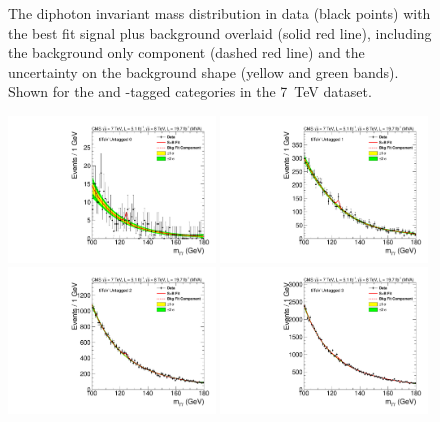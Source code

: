 \begin{figure}
  \caption[The diphoton invariant mass distribution in data with the best fit signal plus background overlaid for the \acs{VH} and \acs{ttH}-tagged categories in the 8~TeV dataset.]{The diphoton invariant mass distribution in data (black points) with the best fit signal plus background overlaid (solid red line), including the background only component (dashed red line) and the uncertainty on the background shape (yellow and green bands). Shown for the \VH and \ttH-tagged categories in the 7~TeV dataset.}
  \label{fig:bfres2}
\end{figure}

\begin{figure}
  \vspace{-1cm}
  \includegraphics[width=0.49\textwidth]{results/plots/mgg-cats/mgg_mva_nosub_ch2_cat0_8TeV.pdf}
  \includegraphics[width=0.49\textwidth]{results/plots/mgg-cats/mgg_mva_nosub_ch2_cat1_8TeV.pdf}
  \includegraphics[width=0.49\textwidth]{results/plots/mgg-cats/mgg_mva_nosub_ch2_cat2_8TeV.pdf}
  \includegraphics[width=0.49\textwidth]{results/plots/mgg-cats/mgg_mva_nosub_ch2_cat3_8TeV.pdf}

\end{figure}
